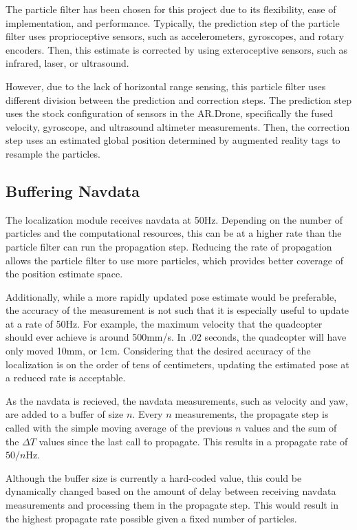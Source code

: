 	The particle filter has been chosen for this project due to its flexibility, ease of implementation, and performance. Typically, the prediction step of the particle filter uses proprioceptive sensors, such as accelerometers, gyroscopes, and rotary encoders. Then, this estimate is corrected by using exteroceptive sensors, such as infrared, laser, or ultrasound.

	However, due to the lack of horizontal range sensing, this particle filter uses different division between the prediction and correction steps. The prediction step uses the stock configuration of sensors in the AR.Drone, specifically the fused velocity, gyroscope, and ultrasound altimeter measurements. Then, the correction step uses an estimated global position determined by augmented reality tags to resample the particles.


	\subsection{Buffering Navdata}

		The localization module receives navdata at 50Hz. Depending on the number of particles and the computational resources, this can be at a higher rate than the particle filter can run the propagation step. Reducing the rate of propagation allows the particle filter to use more particles, which provides better coverage of the position estimate space.

		Additionally, while a more rapidly updated pose estimate would be preferable, the accuracy of the measurement is not such that it is especially useful to update at a rate of 50Hz. For example, the maximum velocity that the quadcopter should ever achieve is around 500mm/s. In .02 seconds, the quadcopter will have only moved 10mm, or 1cm. Considering that the desired accuracy of the localization is on the order of tens of centimeters, updating the estimated pose at a reduced rate is acceptable.

		As the navdata is recieved, the navdata measurements, such as velocity and yaw, are added to a buffer of size $n$. Every $n$ measurements, the propagate step is called with the simple moving average of the previous $n$ values and the sum of the $\Delta T$ values since the last call to propagate. This results in a propagate rate of $50/n$Hz.

		Although the buffer size is currently a hard-coded value, this could be dynamically changed based on the amount of delay between receiving navdata measurements and processing them in the propagate step. This would result in the highest propagate rate possible given a fixed number of particles.

